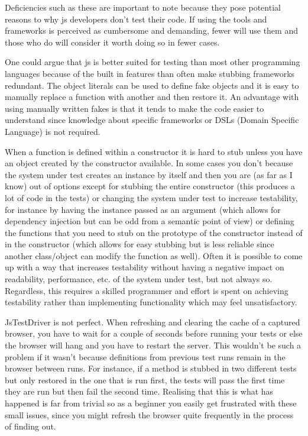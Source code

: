 \documentclass[11pt]{article}
\begin{document}
Deficiencies such as these are important to note because they pose potential reasons to why \gls{js} developers don't test their code. If using the tools and frameworks is perceived as cumbersome and demanding, fewer will use them and those who do will consider it worth doing so in fewer cases.

One could argue that \gls{js} is better suited for testing than most other programming languages because of the built in features than often make stubbing frameworks redundant. The object literals can be used to define fake objects and it is easy to manually replace a function with another and then restore it. An advantage with using manually written fakes is that it tends to make the code easier to understand since knowledge about specific frameworks or DSLs (Domain Specific Language) is not required. \cite[questions~20-21]{Edelstam}\label{LiteralFakes}

When a function is defined within a constructor it is hard to stub unless you have an object created by the constructor available. In some cases you don't because the system under test creates an instance by itself and then you are (as far as I know) out of options except for stubbing the entire constructor (this produces a lot of code in the tests) or changing the system under test to increase testability, for instance by having the instance passed as an argument (which allows for dependency injection but can be odd from a semantic point of view) or defining the functions that you need to stub on the prototype of the constructor instead of in the constructor (which allows for easy stubbing but is less reliable since another class/object can modify the function as well). Often it is possible to come up with a way that increases testability without having a negative impact on readability, performance, etc. of the system under test, but not always so. Regardless, this requires a skilled programmer and effort is spent on achieving testability rather than implementing functionality which may feel unsatisfactory.

JsTestDriver is not perfect. When refreshing and clearing the cache of a captured browser, you have to wait for a couple of seconds before running your tests or else the browser will hang and you have to restart the server. This wouldn't be such a problem if it wasn't because definitions from previous test runs remain in the browser between runs. For instance, if a method is stubbed in two different tests but only restored in the one that is run first, the tests will pass the first time they are run but then fail the second time. Realising that this is what has happened is far from trivial so as a beginner you easily get frustrated with these small issues, since you might refresh the browser quite frequently in the process of finding out.
\end{document}
